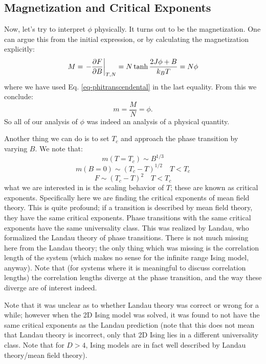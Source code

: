 \subsection{Magnetization and Critical Exponents}
Now, let's try to interpret $\phi$ physically. It turns out to be the magnetization. One can argue this from the initial expression, or by calculating the magnetization explicitly:
\begin{equation}
    M = \left.-\dpd{F}{B}\right|_{T, N} = N\tanh \frac{2J\phi + B}{k_B T} = N\phi
\end{equation}
where we have used Eq. \eqref{eq-phitranscendental} in the last equality. From this we conclude:
\begin{equation}
    m = \frac{M}{N} = \phi.
\end{equation}
So all of our analysis of $\phi$ was indeed an analysis of a physical quantity. 

Another thing we can do is to set $T_c$ and approach the phase transition by varying $B$. We note that:
\begin{equation}
    m(T = T_c) \sim B^{1/3}
\end{equation}
\begin{equation}
    m(B = 0) \sim (T_c - T)^{1/2} \quad T < T_c
\end{equation}
\begin{equation}
    F \sim (T_c - T)^2 \quad T < T_c
\end{equation}
what we are interested in is the scaling behavior of $T$; these are known as critical exponents. Specifically here we are finding the critical exponents of mean field theory. This is quite profound; if a transition is described by mean field theory, they have the same critical exponents. Phase transitions with the same critical exponents have the same universality class. This was realized by Landau, who formalized the Landau theory of phase transitions. There is not much missing here from the Landau theory; the only thing which was missing is the correlation length of the system (which makes no sense for the infinite range Ising model, anyway). Note that (for systems where it is meaningful to discuss correlation lengths) the correlation lengths diverge at the phase transition, and the way these diverge are of interest indeed.

Note that it was unclear as to whether Landau theory was correct or wrong for a while; however when the 2D Ising model was solved, it was found to not have the same critical exponents as the Landau prediction (note that this does not mean that Landau theory is incorrect, only that 2D Ising lies in a different universality class. Note that for $D > 4$, Ising models are in fact well described by Landau theory/mean field theory).

